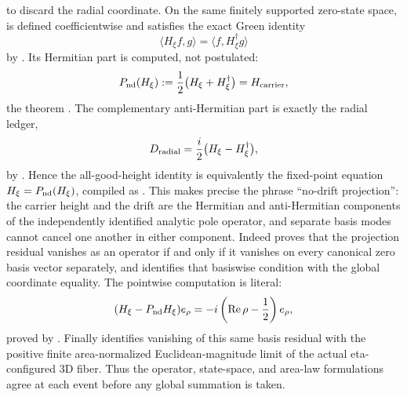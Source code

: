 \documentclass[11pt]{article}
\theoremstyle{definition}
\renewcommand{\Re}{\operatorname{Re}}
\begin{document}
to discard the radial coordinate.  On the same finitely supported zero-state
space,  is defined coefficientwise and satisfies
the exact Green identity
\[
 \langle H_{\xi}f,g\rangle=\langle f,H_{\xi}^{\dagger}g\rangle
\]
by .  Its Hermitian part is computed,
not postulated:
\[
 P_{\rm nd}(H_{\xi})
   :=\frac12\bigl(H_{\xi}+H_{\xi}^{\dagger}\bigr)
   =H_{\rm carrier},
\]
the theorem .  The
complementary anti-Hermitian part is exactly the radial ledger,
\[
 D_{\rm radial}
   =\frac{i}{2}\bigl(H_{\xi}-H_{\xi}^{\dagger}\bigr),
\]
by .  Hence the
all-good-height identity is equivalently the fixed-point equation
\(H_{\xi}=P_{\rm nd}(H_{\xi})\), compiled as
.
This makes precise the phrase ``no-drift projection'': the carrier height and
the drift are the Hermitian and anti-Hermitian components of the independently
identified analytic pole operator, and separate basis modes cannot cancel one
another in either component.  Indeed
 proves that the projection
residual vanishes as an operator if and only if it vanishes on every canonical
zero basis vector separately, and
identifies that basiswise condition with the global coordinate equality.  The
pointwise computation is literal:
\[
 (H_\xi-P_{\rm nd}H_\xi)e_\rho
   =-i\left(\Re\rho-\frac12\right)e_\rho,
\]
proved by .  Finally
 identifies
vanishing of this same basis residual with the positive finite area-normalized
Euclidean-magnitude limit of the actual eta-configured 3D fiber.  Thus the
operator, state-space, and area-law formulations agree at each event before any
global summation is taken.
\end{document}
